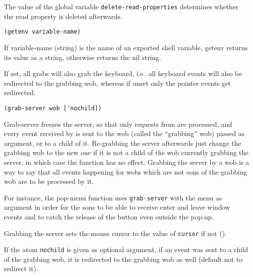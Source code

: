 The value of the global variable \verb|delete-read-properties| determines
whether the read property is deleted afterwards.

        
{\usagefont\begin{verbatim}
(getenv variable-name)
\end{verbatim}}\usageupspace

If variable-name (string) is the name of an exported shell variable, getenv
returns its value as a string, otherwise returns the nil string.



If set, all grabs will also grab the keyboard, i.e.\ all keyboard events will
also be redirected to the grabbing wob, whereas if unset only the pointer
events get redirected.

        
{\usagefont\begin{verbatim}
(grab-server wob ['nochild])
\end{verbatim}}\usageupspace

Grab-server freezes the server, so that only requests from {\GWM} are
processed, and every event received by {\GWM} is sent to the wob (called the
``grabbing'' wob) passed as argument, or to a child of it. Re-grabbing the
server afterwards just change the grabbing wob to the new one if it is not a
child of the wob currently grabbing the server, in which case the function
has no effect. Grabbing the server by a wob is a way to say that all events
happening for wobs which are not sons of the grabbing wob are to be
processed by it.

For instance, the pop-menu function uses \verb"grab-server" with the menu as
argument in order for the sons to be able to receive enter and leave window
events and to catch the release of the button even outside the pop-up.

Grabbing the server sets the mouse cursor to the value of \verb"cursor" if not
().

If the atom \verb"nochild" is given as optional argument, if an event
was sent to a child of the grabbing wob, it is redirected to the grabbing
wob as well (default not to redirect it).

        
